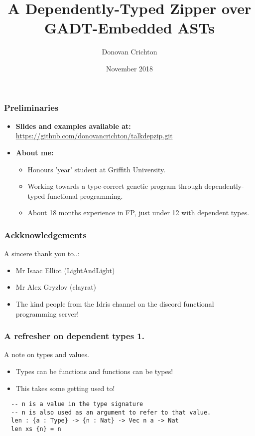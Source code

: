 \documentclass{beamer}
\title{A Dependently-Typed Zipper over GADT-Embedded ASTs}
\author{Donovan Crichton}
\date{November 2018}
\begin{document}
 
\frame{\titlepage}

\begin{frame}[fragile]
  \frametitle{Preliminaries}
  \begin{itemize}
    \item \textbf{Slides and examples available at:}
    \url{https://github.com/donovancrichton/talkdepzip.git}
  \item \textbf{About me:}
    \begin{itemize}
      \item Honours 'year' student at Griffith University.
      \item Working towards a type-correct genetic program through
              dependently-typed functional programming.
      \item About 18 months experience in FP, just under 12 with
              dependent types.
    \end{itemize}
  \end{itemize}
\end{frame}

\begin{frame}[fragile]
  \frametitle{Ackknowledgements}
  \begin{block}{A sincere thank you to..:}
    \begin{itemize}
      \item Mr Isaac Elliot (LightAndLight)
      \item Mr Alex Gryzlov (clayrat)
      \item The kind people from the Idris channel 
        on the discord functional programming server!
    \end{itemize}
  \end{block}
\end{frame}

\begin{frame}[fragile]
  \frametitle{A refresher on dependent types 1.}
  \begin{block}{A note on types and values.}
    \begin{itemize}
    \item Types can be functions and functions can be types!
    \item This takes some getting used to!
    \end{itemize}
  \end{block}
  \begin{verbatim}
  -- n is a value in the type signature
  -- n is also used as an argument to refer to that value.
  len : {a : Type} -> {n : Nat} -> Vec n a -> Nat
  len xs {n} = n
  \end{verbatim}
\end{frame}
\end{document}

